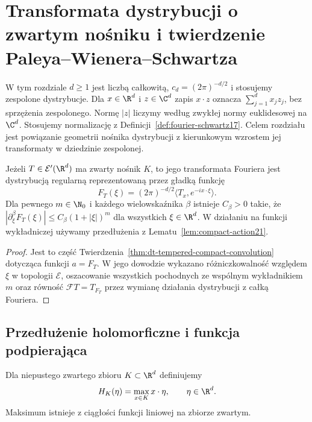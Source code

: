 \section{Transformata dystrybucji o zwartym nośniku i twierdzenie Paleya--Wienera--Schwartza}
\providecommand{\atlasref}[2]{#2}

W tym rozdziale $d\ge1$ jest liczbą całkowitą,
$c_d=(2\pi)^{-d/2}$ i stosujemy zespolone dystrybucje.
Dla $x\in\R^d$ i $z\in\C^d$ zapis $x\cdot z$
oznacza $\sum_{j=1}^dx_jz_j$, bez sprzężenia zespolonego.
Normę $|z|$ liczymy według zwykłej normy euklidesowej
na $\C^d$.
Stosujemy normalizację z Definicji~\ref{def:fourier-schwartz17}.
Celem rozdziału jest powiązanie geometrii nośnika
dystrybucji z kierunkowym wzrostem jej transformaty
w dziedzinie zespolonej.

\begin{twierdzenie}
\label{thm:compact-fourier22}
Jeżeli $T\in\mathcal E'(\R^d)$ ma zwarty nośnik $K$,
to jego transformata Fouriera jest dystrybucją regularną
reprezentowaną przez gładką funkcję
\[
F_T(\xi)=(2\pi)^{-d/2}\langle T_x,e^{-ix\cdot\xi}\rangle.
\]
Dla pewnego $m\in\N_0$ i każdego wielowskaźnika $\beta$
istnieje $C_\beta>0$ takie, że
$|\partial_\xi^\beta F_T(\xi)|
\le C_\beta(1+|\xi|)^m$
dla wszystkich $\xi\in\R^d$.
W działaniu na funkcji wykładniczej używamy
przedłużenia z Lematu~\ref{lem:compact-action21}.
\end{twierdzenie}
\begin{proof}
Jest to część Twierdzenia~\ref{thm:dt-tempered-compact-convolution}
dotycząca funkcji $a=F_T$. W jego dowodzie wykazano
różniczkowalność względem $\xi$ w topologii $\mathcal E$,
oszacowanie wszystkich pochodnych ze wspólnym
wykładnikiem $m$ oraz równość $\mathcal FT=T_{F_T}$
przez wymianę działania dystrybucji z całką Fouriera.
\end{proof}

\subsection{Przedłużenie holomorficzne i funkcja podpierająca}

\begin{definicja}
\label{def:dt-support-function}
Dla niepustego zwartego zbioru $K\subset\R^d$
definiujemy
\[
 H_K(\eta)=\max_{x\in K}x\cdot\eta,\qquad \eta\in\R^d.
\]
Maksimum istnieje z ciągłości funkcji liniowej na
zbiorze zwartym.
\end{definicja}


